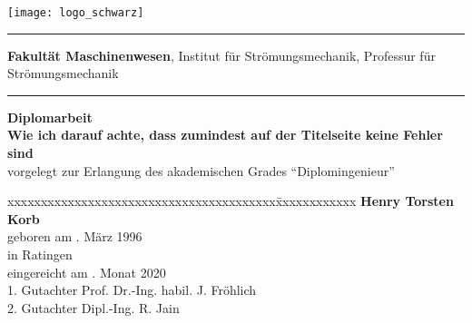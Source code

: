 \begin{titlepage}
\addtolength{\topmargin}{-1.5cm}
\hspace{-2.1cm} \texttt{[image: logo\_schwarz]}
\vspace{0.5cm}
\hrule 
\vspace{0.05cm}
\small\textbf{Fakult\"at Maschinenwesen},
Institut f\"ur Str\"omungsmechanik,
Professur f\"ur Str\"omungsmechanik
\vspace{0.1cm}
\hrule 
\vspace{4cm}
\textbf{\Large Diplomarbeit}\\

\vspace{1.5cm}
%
\textbf{\LARGE Wie ich darauf achte, dass zumindest auf der Titelseite keine Fehler sind}\\[2.0cm]
%

vorgelegt zur Erlangung des akademischen Grades "`Diplomingenieur"'\\[2.5cm]

\begin{tabbing}
	xxxxxxxxxxxxxxxxxxxxxxxxxxxxxxxxxxxxxxxx\=xxxxxxxxxxxx\kill
	\>	\textbf{Henry Torsten Korb}									\\
	geboren am						. März 1996											\\
	in										\>	Ratingen															\\[0.1cm]
	eingereicht am				. Monat 2020													\\[0.5cm]
	1. Gutachter					\>  Prof. Dr.-Ing. habil. J. Fr\"ohlich			\\
	2. Gutachter					\>	Dipl.-Ing. R. Jain											\\
\end{tabbing}
\cleardoublepage

\end{titlepage}